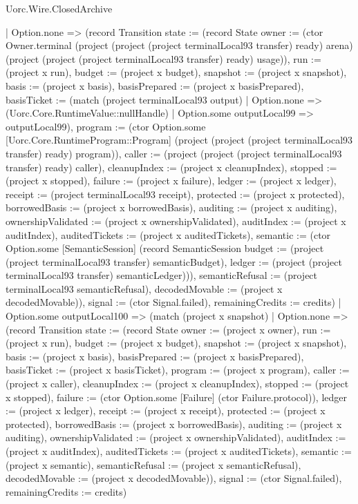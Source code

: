 \begin{lexlean}{Uorc.Wire.ClosedArchive}
\begin{semanticmodule}
{            | Option.none => (record Transition {state := (record State {owner := (ctor Owner.terminal (project (project (project terminalLocal93 transfer) ready) arena) (project (project (project terminalLocal93 transfer) ready) usage)), run := (project x run), budget := (project x budget), snapshot := (project x snapshot), basis := (project x basis), basisPrepared := (project x basisPrepared), basisTicket := (match (project terminalLocal93 output)
              | Option.none => (Uorc.Core.RuntimeValue::nullHandle)
              | Option.some outputLocal99 => outputLocal99), program := (ctor Option.some [Uorc.Core.RuntimeProgram::Program] (project (project (project terminalLocal93 transfer) ready) program)), caller := (project (project (project terminalLocal93 transfer) ready) caller), cleanupIndex := (project x cleanupIndex), stopped := (project x stopped), failure := (project x failure), ledger := (project x ledger), receipt := (project terminalLocal93 receipt), protected := (project x protected), borrowedBasis := (project x borrowedBasis), auditing := (project x auditing), ownershipValidated := (project x ownershipValidated), auditIndex := (project x auditIndex), auditedTickets := (project x auditedTickets), semantic := (ctor Option.some [SemanticSession] (record SemanticSession {budget := (project (project terminalLocal93 transfer) semanticBudget), ledger := (project (project terminalLocal93 transfer) semanticLedger)})), semanticRefusal := (project terminalLocal93 semanticRefusal), decodedMovable := (project x decodedMovable)}), signal := (ctor Signal.failed), remainingCredits := credits})
            | Option.some outputLocal100 => (match (project x snapshot)
              | Option.none => (record Transition {state := (record State {owner := (project x owner), run := (project x run), budget := (project x budget), snapshot := (project x snapshot), basis := (project x basis), basisPrepared := (project x basisPrepared), basisTicket := (project x basisTicket), program := (project x program), caller := (project x caller), cleanupIndex := (project x cleanupIndex), stopped := (project x stopped), failure := (ctor Option.some [Failure] (ctor Failure.protocol)), ledger := (project x ledger), receipt := (project x receipt), protected := (project x protected), borrowedBasis := (project x borrowedBasis), auditing := (project x auditing), ownershipValidated := (project x ownershipValidated), auditIndex := (project x auditIndex), auditedTickets := (project x auditedTickets), semantic := (project x semantic), semanticRefusal := (project x semanticRefusal), decodedMovable := (project x decodedMovable)}), signal := (ctor Signal.failed), remainingCredits := credits})
}
\end{semanticmodule}
\end{lexlean}
